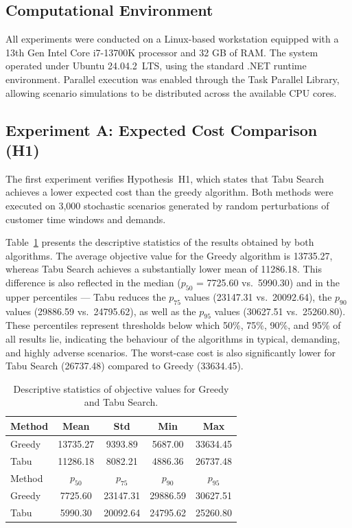 \subsection{Computational Environment}

All experiments were conducted on a Linux-based workstation equipped with a 13th Gen Intel Core i7-13700K processor and 32 GB of RAM. The system operated under Ubuntu 24.04.2~LTS, using the standard .NET runtime environment. Parallel execution was enabled through the Task Parallel Library, allowing scenario simulations to be distributed across the available CPU cores.



\subsection{Experiment A: Expected Cost Comparison (H1)}

The first experiment verifies Hypothesis~H1, which states that Tabu Search achieves a lower expected cost than the greedy algorithm. Both methods were executed on 3,000 stochastic scenarios generated by random perturbations of customer time windows and demands.

Table~\ref{tab:expA_summary} presents the descriptive statistics of the results obtained by both algorithms. 
The average objective value for the Greedy algorithm is 13735.27, whereas Tabu Search achieves a substantially lower mean of 11286.18. 
This difference is also reflected in the median ($p_{50}$ = 7725.60 vs.\ 5990.30) and in the upper percentiles — Tabu reduces the $p_{75}$ values (23147.31 vs.\ 20092.64), the $p_{90}$ values (29886.59 vs.\ 24795.62), as well as the $p_{95}$ values (30627.51 vs.\ 25260.80).
These percentiles represent thresholds below which 50\%, 75\%, 90\%, and 95\% of all results lie, indicating the behaviour of the algorithms in typical, demanding, and highly adverse scenarios.
The worst-case cost is also significantly lower for Tabu Search (26737.48) compared to Greedy (33634.45).



\begin{table}[ht]
    \renewcommand{\arraystretch}{1.5}
    \caption{Descriptive statistics of objective values for Greedy and Tabu Search.}
    \label{tab:expA_summary}
    \centering
    \begin{tabular}{l|c|c|c|c}
        \hline\hline
        Method & Mean & Std & Min & Max \\
        \hline\hline
        Greedy & 13735.27 & 9393.89 & 5687.00 & 33634.45 \\ \hline
        Tabu   & 11286.18 & 8082.21 & 4886.36 & 26737.48 \\ 
        \hline\hline
        Method & $p_{50}$ & $p_{75}$ & $p_{90}$ & $p_{95}$ \\ \hline
        Greedy & 7725.60&23147.31&29886.59&30627.51 \\ \hline
        Tabu   & 5990.30&20092.64&24795.62&25260.80 \\
        \hline\hline
    \end{tabular}
\end{table}


